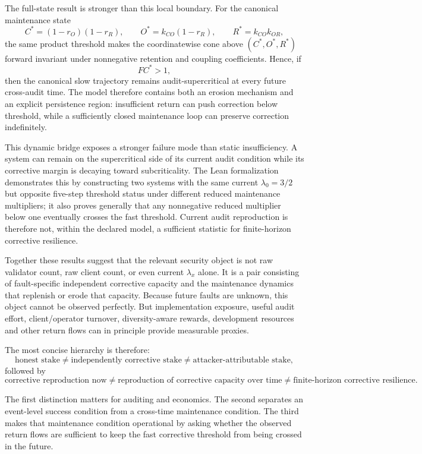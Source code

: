 The full-state result is stronger than this local boundary. For the canonical maintenance state
\[
C^*=(1-r_O)(1-r_R),\qquad
O^*=k_{CO}(1-r_R),\qquad
R^*=k_{CO}k_{OR},
\]
the same product threshold makes the coordinatewise cone above $(C^*,O^*,R^*)$ forward invariant under nonnegative retention and coupling coefficients. Hence, if
\[
FC^*>1,
\]
then the canonical slow trajectory remains audit-supercritical at every future cross-audit time. The model therefore contains both an erosion mechanism and an explicit persistence region: insufficient return can push correction below threshold, while a sufficiently closed maintenance loop can preserve correction indefinitely.

This dynamic bridge exposes a stronger failure mode than static insufficiency. A system can remain on the supercritical side of its current audit condition while its corrective margin is decaying toward subcriticality. The Lean formalization demonstrates this by constructing two systems with the same current \(\lambda_0=3/2\) but opposite five-step threshold status under different reduced maintenance multipliers; it also proves generally that any nonnegative reduced multiplier below one eventually crosses the fast threshold. Current audit reproduction is therefore not, within the declared model, a sufficient statistic for finite-horizon corrective resilience.

Together these results suggest that the relevant security object is not raw validator count, raw client count, or even current \(\lambda_x\) alone. It is a pair consisting of fault-specific independent corrective capacity and the maintenance dynamics that replenish or erode that capacity. Because future faults are unknown, this object cannot be observed perfectly. But implementation exposure, useful audit effort, client/operator turnover, diversity-aware rewards, development resources and other return flows can in principle provide measurable proxies.

The most concise hierarchy is therefore:
\[
\boxed{
\text{honest stake}
\neq
\text{independently corrective stake}
\neq
\text{attacker-attributable stake},
}
\]
followed by
\[
\boxed{
\text{corrective reproduction now}
\neq
\text{reproduction of corrective capacity over time}
\neq
\text{finite-horizon corrective resilience}.
}
\]

The first distinction matters for auditing and economics. The second separates an event-level success condition from a cross-time maintenance condition. The third makes that maintenance condition operational by asking whether the observed return flows are sufficient to keep the fast corrective threshold from being crossed in the future.


